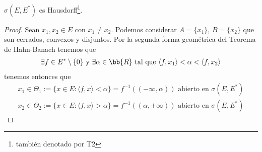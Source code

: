 \begin{prop}
    $\sigma(E,E^*)$ es Hausdorff\footnote{también denotado por T2}.
    \begin{proof}
        Sean $x_1,x_2\in E$ con $x_1\neq x_2$. Podemos considerar $A=\{x_1\}$, $B=\{x_2\}$ que son cerrados, convexos y disjuntos. Por la segunda forma geométrica del Teorema de Hahn-Banach tenemos que 
        \begin{gather*}
            \exists f \in E^*\setminus\{0\}\text{ y } \exists \alpha\in \bb{R} \text{ tal que } \langle f,x_1 \rangle < \alpha < \langle f,x_2\rangle
        \end{gather*}
        tenemos entonces que 
        \begin{gather*}
            x_1\in \Theta_1 := \{x \in E : \langle f,x \rangle < \alpha\} = f^{-1} ((-\infty, \alpha)) \text{ abierto en } \sigma(E, E^*)\\
            x_2\in \Theta_2 := \{x \in E : \langle f,x \rangle > \alpha\} = f^{-1} ((\alpha, +\infty)) \text{ abierto en } \sigma(E, E^*)
        \end{gather*}
    \end{proof}
\end{prop}

